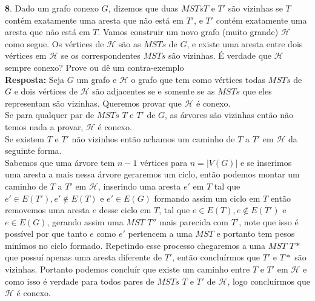 
\noindent \textbf{8}. Dado um grafo conexo $G$, dizemos que duas $MSTs T$  e $T'$ são vizinhas se $T$ contém exatamente uma aresta que não está em $T'$, e $T'$ contém exatamente uma aresta que não está em $T$. Vamos construir um novo grafo (muito grande) $\mathcal{H}$ como segue. Os vértices de $\mathcal{H}$ são as $MSTs$ de $G$, e existe uma aresta entre dois vértices em $\mathcal{H}$ se os correspondentes $MSTs$ são vizinhas. É verdade que $\mathcal{H}$ sempre conexo? Prove ou dê um contra-exemplo
\\[6pt]
\noindent \textbf{Resposta:} Seja $G$ um grafo e $\mathcal{H}$ o grafo que tem como vértices todas $MSTs$ de $G$ e dois vértices de $\mathcal{H}$ são adjacentes se e somente se as $MSTs$ que eles representam são vizinhas. Queremos provar que $\mathcal{H}$ é conexo.
\\[6pt]
\noindent Se para qualquer par de $MSTs$ $T$ e $T'$ de $G$, as árvores são vizinhas então não temos nada a provar, $\mathcal{H}$ é conexo.
\\[6pt]
\noindent Se existem $T$ e $T'$ não vizinhos então achamos um caminho de $T$ a $T'$ em $\mathcal{H}$ da seguinte forma.
\\[6pt]
\noindent Sabemos que uma árvore tem $n-1$ vértices para $n = |V(G)|$ e se inserimos uma aresta a mais nessa árvore geraremos um ciclo, então podemos montar um caminho de $T$ a $T'$ em $\mathcal{H}$, inserindo uma aresta $e'$ em $T$ tal que $e' \in E(T'), e' \notin E(T)$ e $e' \in E(G)$ formando assim um ciclo em $T$ então removemos uma aresta $e$ desse ciclo em $T$, tal que $e \in E(T), e \notin E(T')$ e $e \in E(G)$, gerando assim uma $MST$ $T''$ mais parecida com $T'$, note que isso é possível por que tanto $e$ como $e'$ pertencem a uma $MST$ e portanto tem pesos minímos no ciclo formado. Repetindo esse processo chegaremos a uma $MST$ $T*$ que possuí apenas uma aresta diferente de $T'$, então concluírmos que $T'$ e $T*$ são vizinhas. Portanto podemos concluír que existe um caminho entre $T$ e $T'$ em $\mathcal{H}$ e como isso é verdade para todos pares de $MSTs$ $T$ e $T'$ de $\mathcal{H}$, logo concluírmos que $\mathcal{H}$ é conexo.\\[6pt]